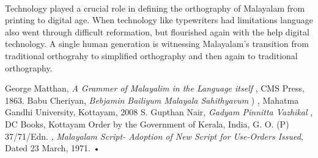 \documentclass[10pt]{article}
\begin{document}
\paragraph{}
Technology played a crucial role in defining the orthography of Malayalam from printing to digital age. When technology like typewriters had limitations language also went through difficult reformation, but flourished again with the help digital technology. A single human generation is witnessing Malayalam's transition from traditional orthograhy to simplified orthography and then again to traditional orthography.

\begin{thebibliography}{9}
 George Matthan, \textit{A Grammer of Malayalim in the Language itself }, CMS Press, 1863.
 Babu Cheriyan, \textit{Bebjamin Bailiyum Malayala Sahithyavum} {) }, Mahatma Gandhi University, Kottayam, 2008
 S. Gupthan Nair, \textit{Gadyam Pinnitta Vazhikal}{ }, DC Books, Kottayam
 Order by the Government of Kerala, India, G. O. (P) 37/71/Edn. , \textit{Malayalam Script- Adoption of New Script for Use-Orders Issued}, Dated 23 March, 1971.
•


\end{thebibliography}
\end{document}
